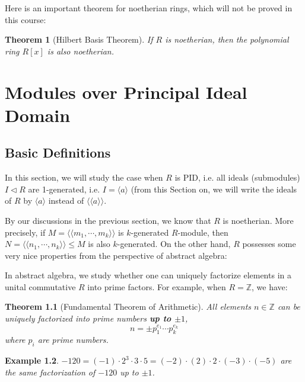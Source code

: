 \documentclass[12pt]{amsbook}
\newtheorem{theorem}{Theorem}[section]
\newtheorem{example}[theorem]{Example}
\begin{document}
Here is an important theorem for noetherian rings, which will not be proved in this course:
\begin{theorem} [Hilbert Basis Theorem]
    If $R$ is noetherian, then the polynomial ring $R[x]$ is also noetherian.
\end{theorem}


\chapter{Modules over Principal Ideal Domain}
\section{Basic Definitions}
In this section, we will study the case when $R$ is PID, i.e. all ideals (submodules) $I\lhd R$ are 1-generated, i.e. $I=\langle a \rangle$ (from this Section on, we will write the ideals of $R$ by $\langle a \rangle$ instead of $\langle \langle a \rangle \rangle$. 

By our discussions in the previous section, we know that $R$ is noetherian. More precisely, if $M=\langle\langle m_1,\cdots,m_k\rangle\rangle$ is $k$-generated $R$-module, then $N=\langle\langle n_1,\cdots,n_k\rangle\rangle\leq M$ is also $k$-generated. On the other hand, $R$ possesses some very nice properties from the perspective of abstract algebra:

In abstract algebra, we study whether one can uniquely factorize elements in a unital commutative $R$ into prime factors. For example, when $R=\mathbb{Z}$, we have:

\begin{theorem} [Fundamental Theorem of Arithmetic]
    All elements $n\in \mathbb{Z}$ can be uniquely factorized into prime numbers {\bf up to $\pm1$},
    $$n= \pm p_1^{e_1}\cdots p_k^{e_k}$$
    where $p_i$ are prime numbers.
\end{theorem}

\begin{example}
    $-120=(-1)\cdot2^3\cdot3\cdot5=(-2)\cdot(2)\cdot2\cdot(-3)\cdot(-5)$ are the same factorization of $-120$ up to $\pm1$.
\end{example}
\end{document}
